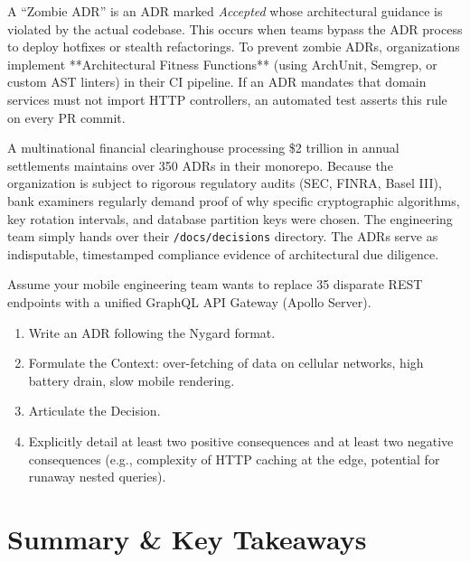 \begin{productionwarningbox}
A ``Zombie ADR'' is an ADR marked \textit{Accepted} whose architectural guidance is violated by the actual codebase. This occurs when teams bypass the ADR process to deploy hotfixes or stealth refactorings. To prevent zombie ADRs, organizations implement **Architectural Fitness Functions** (using ArchUnit, Semgrep, or custom AST linters) in their CI pipeline. If an ADR mandates that domain services must not import HTTP controllers, an automated test asserts this rule on every PR commit.
\end{productionwarningbox}

\begin{realworldbox}
A multinational financial clearinghouse processing \$2 trillion in annual settlements maintains over 350 ADRs in their monorepo. Because the organization is subject to rigorous regulatory audits (SEC, FINRA, Basel III), bank examiners regularly demand proof of why specific cryptographic algorithms, key rotation intervals, and database partition keys were chosen. The engineering team simply hands over their \texttt{/docs/decisions} directory. The ADRs serve as indisputable, timestamped compliance evidence of architectural due diligence.
\end{realworldbox}

\begin{tryityourselfbox}
Assume your mobile engineering team wants to replace 35 disparate REST endpoints with a unified GraphQL API Gateway (Apollo Server). 
\begin{enumerate}
  \item Write an ADR following the Nygard format.
  \item Formulate the Context: over-fetching of data on cellular networks, high battery drain, slow mobile rendering.
  \item Articulate the Decision.
  \item Explicitly detail at least two positive consequences and at least two negative consequences (e.g., complexity of HTTP caching at the edge, potential for runaway nested queries).
\end{enumerate}
\end{tryityourselfbox}

\section{Summary \protect\& Key Takeaways}

